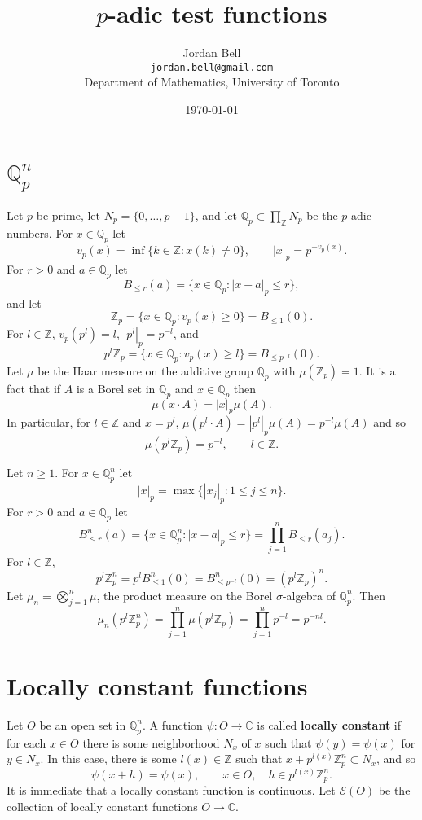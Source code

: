 \documentclass{article}
\theoremstyle{definition}
\begin{document}
\title{$p$-adic test functions}
\author{Jordan Bell\\ \texttt{jordan.bell@gmail.com}\\Department of Mathematics, University of Toronto}
\date{\today}

\maketitle


\section{$\mathbb{Q}_p^n$}
Let $p$ be prime, let $N_p = \{0,\ldots,p-1\}$, and let $\mathbb{Q}_p \subset \prod_{\mathbb{Z}} N_p$ be the $p$-adic numbers.
For $x \in \mathbb{Q}_p$ let
\[
v_p(x) = \inf\{k \in \mathbb{Z}: x(k) \neq 0\},\qquad |x|_p = p^{-v_p(x)}.
\]
For $r>0$ and $a \in \mathbb{Q}_p$ let
\[
B_{\leq r}(a) = \{x \in \mathbb{Q}_p : |x-a|_p \leq r\},
\]
and let 
\[
\mathbb{Z}_p = \{x \in \mathbb{Q}_p : v_p(x) \geq 0\} = B_{\leq 1}(0).
\]
For $l \in \mathbb{Z}$, $v_p(p^l) = l$, $|p^l|_p = p^{-l}$, and
\[
p^l \mathbb{Z}_p = \{x \in \mathbb{Q}_p : v_p(x) \geq l\} = B_{\leq p^{-l}}(0).
\]
Let $\mu$ be the Haar measure on the additive group $\mathbb{Q}_p$ with $\mu(\mathbb{Z}_p)=1$. It is a fact
that if $A$ is a Borel set in $\mathbb{Q}_p$ and $x \in \mathbb{Q}_p$ then
\[
\mu(x \cdot A) = |x|_p \mu(A).
\]
In particular, for $l \in \mathbb{Z}$ and $x = p^l$, $\mu(p^l \cdot A) = |p^l|_p \mu(A) = p^{-l} \mu(A)$
and so
\[
\mu(p^l \mathbb{Z}_p) = p^{-l},\qquad l \in \mathbb{Z}.
\]


Let $n \geq 1$. For $x \in \mathbb{Q}_p^n$ let
\[
|x|_p = \max\{|x_j|_p : 1 \leq j \leq n\}.
\]
For $r>0$ and $a \in \mathbb{Q}_p$ let
\[
B_{\leq r}^n(a) = \{x \in \mathbb{Q}_p^n : |x-a|_p \leq r\} = \prod_{j=1}^n B_{\leq r}(a_j).
\]
For $l \in \mathbb{Z}$,
\[
p^l \mathbb{Z}_p^n = p^l B_{\leq 1}^n(0) = B_{\leq p^{-l}}^n(0)
=(p^l \mathbb{Z}_p)^n.
\]
Let $\mu_n = \bigotimes_{j=1}^n \mu$, the product measure on the Borel $\sigma$-algebra of $\mathbb{Q}_p^n$. 
Then
\[
\mu_n(p^l \mathbb{Z}_p^n) =  \prod_{j=1}^n  \mu(p^l \mathbb{Z}_p)
=\prod_{j=1}^n p^{-l} = p^{-nl}.
\]




\section{Locally constant functions}
Let $O$ be an open set in $\mathbb{Q}_p^n$. A function $\psi:O \to \mathbb{C}$ is called \textbf{locally constant}
if for each $x \in O$ there is some neighborhood $N_x$ of $x$ such that $\psi(y)=\psi(x)$ for $y \in N_x$. 
In this case, there is some $l(x) \in \mathbb{Z}$ such that $x+p^{l(x)} \mathbb{Z}_p^n \subset N_x$, and so
\[
\psi(x+h) = \psi(x),\qquad x \in O,\quad h \in p^{l(x)} \mathbb{Z}_p^n.
\]
It is immediate that a locally constant function is continuous. Let $\mathcal{E}(O)$ be the collection of locally
constant functions $O \to \mathbb{C}$. 
\end{document}
